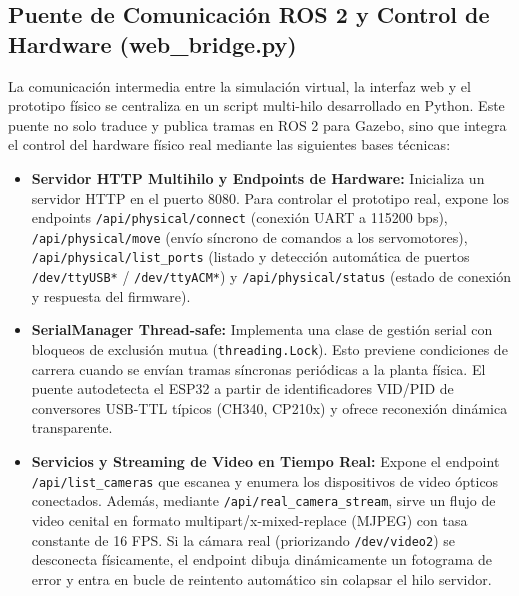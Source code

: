 \documentclass[conference,a4paper]{IEEEtran}
\begin{document}
\subsection{Puente de Comunicación ROS 2 y Control de Hardware (web\_bridge.py)}
La comunicación intermedia entre la simulación virtual, la interfaz web y el prototipo físico se centraliza en un script multi-hilo desarrollado en Python. Este puente no solo traduce y publica tramas en ROS 2 para Gazebo, sino que integra el control del hardware físico real mediante las siguientes bases técnicas:
\begin{itemize}
    \item \textbf{Servidor HTTP Multihilo y Endpoints de Hardware:} Inicializa un servidor HTTP en el puerto 8080. Para controlar el prototipo real, expone los endpoints \texttt{/api/}\allowbreak\texttt{physical/}\allowbreak\texttt{connect} (conexión UART a 115200 bps), \texttt{/api/}\allowbreak\texttt{physical/}\allowbreak\texttt{move} (envío síncrono de comandos a los servomotores), \texttt{/api/}\allowbreak\texttt{physical/}\allowbreak\texttt{list\_ports} (listado y detección automática de puertos \texttt{/dev/}\allowbreak\texttt{ttyUSB*} / \texttt{/dev/}\allowbreak\texttt{ttyACM*}) y \texttt{/api/}\allowbreak\texttt{physical/}\allowbreak\texttt{status} (estado de conexión y respuesta del firmware).
    \item \textbf{SerialManager Thread-safe:} Implementa una clase de gestión serial con bloqueos de exclusión mutua (\texttt{threading.Lock}). Esto previene condiciones de carrera cuando se envían tramas síncronas periódicas a la planta física. El puente autodetecta el ESP32 a partir de identificadores VID/PID de conversores USB-TTL típicos (CH340, CP210x) y ofrece reconexión dinámica transparente.
    \item \textbf{Servicios y Streaming de Video en Tiempo Real:} Expone el endpoint \texttt{/api/}\allowbreak\texttt{list\_cameras} que escanea y enumera los dispositivos de video ópticos conectados. Además, mediante \texttt{/api/}\allowbreak\texttt{real\_}\allowbreak\texttt{camera\_}\allowbreak\texttt{stream}, sirve un flujo de video cenital en formato multipart/x-mixed-replace (MJPEG) con tasa constante de 16 FPS. Si la cámara real (priorizando \texttt{/dev/}\allowbreak\texttt{video2}) se desconecta físicamente, el endpoint dibuja dinámicamente un fotograma de error y entra en bucle de reintento automático sin colapsar el hilo servidor.
\end{itemize}
\end{document}
